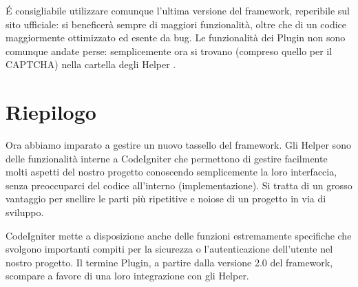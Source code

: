 \'E consigliabile utilizzare comunque l'ultima versione del framework, reperibile sul sito ufficiale: si beneficerà sempre di maggiori funzionalità, oltre che di un codice maggiormente ottimizzato ed esente da bug. Le funzionalità dei Plugin non sono comunque andate perse: semplicemente ora si trovano (compreso quello per il CAPTCHA) nella cartella degli Helper .

\section{Riepilogo}
Ora abbiamo imparato a gestire un nuovo tassello del framework. Gli Helper sono delle funzionalità interne a CodeIgniter che permettono di gestire facilmente molti aspetti del nostro progetto conoscendo semplicemente la loro interfaccia, senza preoccuparci del codice all'interno (implementazione). Si tratta di un grosso vantaggio per snellire le parti più ripetitive e noiose di un progetto in via di sviluppo.

CodeIgniter mette a disposizione anche delle funzioni estremamente specifiche che svolgono importanti compiti per la sicurezza o l'autenticazione dell'utente nel nostro progetto. Il termine Plugin, a partire dalla versione 2.0 del framework, scompare a favore di una loro integrazione con gli Helper.